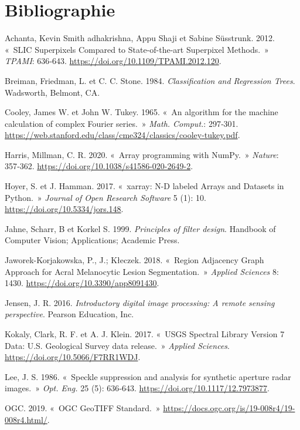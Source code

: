 \documentclass[
  french,
  11pt,
  letterpaper,
  open=any,
  twoside=false,
  french]{scrbook}
\newlength{\cslhangindent}
\newenvironment{CSLReferences}[2] %
 {\begin{list}{}{%
  \setlength{\itemindent}{0pt}
  \setlength{\leftmargin}{0pt}
  \setlength{\parsep}{0pt}
  \ifodd #1
   \setlength{\leftmargin}{\cslhangindent}
   \setlength{\itemindent}{-1\cslhangindent}
  \fi
  \setlength{\itemsep}{#2\baselineskip}}}
 {\end{list}}
\begin{document}

\chapter*{Bibliographie}\label{bibliographie}


\protect{}\label{refs}
\begin{CSLReferences}{1}{0}
Achanta, Kevin Smith adhakrishna, Appu Shaji et Sabine Süsstrunk. 2012.
{«~SLIC Superpixels Compared to State-of-the-art Superpixel Methods.~»}
\emph{{TPAMI}}: 636‑643. \url{https://doi.org/10.1109/TPAMI.2012.120}.

Breiman, Friedman, L. et C. C. Stone. 1984. \emph{Classification and
Regression Trees}. {Wadsworth, Belmont, CA}.

Cooley, James W. et John W. Tukey. 1965. {«~An algorithm for the machine
calculation of complex Fourier series.~»} \emph{{Math. Comput.}}:
297‑301.
\url{https://web.stanford.edu/class/cme324/classics/cooley-tukey.pdf}.

Harris, Millman, C. R. 2020. {«~Array programming with NumPy.~»}
\emph{{Nature}}: 357‑362.
\url{https://doi.org/10.1038/s41586-020-2649-2}.

Hoyer, S. et J. Hamman. 2017. {«~xarray: N-D labeled Arrays and Datasets
in Python.~»} \emph{{Journal of Open Research Software}} 5 (1): 10.
\url{https://doi.org/10.5334/jors.148}.

Jahne, Scharr, B et Korkel S. 1999. \emph{Principles of filter design}.
Handbook of Computer Vision; Applications; Academic Press.

Jaworek-Korjakowska, P., J.; Kłeczek. 2018. {«~Region Adjacency Graph
Approach for Acral Melanocytic Lesion Segmentation.~»} \emph{{Applied
Sciences}} 8: 1430. \url{https://doi.org/10.3390/app8091430}.

Jensen, J. R. 2016. \emph{Introductory digital image processing: A
remote sensing perspective}. {Pearson Education, Inc.}

Kokaly, Clark, R. F. et A. J. Klein. 2017. {«~USGS Spectral Library
Version 7 Data: U.S. Geological Survey data release.~»} \emph{{Applied
Sciences}}. \url{https://doi.org/10.5066/F7RR1WDJ}.

Lee, J. S. 1986. {«~Speckle suppression and analysis for synthetic
aperture radar images.~»} \emph{{Opt. Eng.}} 25 (5): 636‑643.
\url{https://doi.org/10.1117/12.7973877}.

OGC. 2019. {«~{OGC GeoTIFF Standard}.~»}
\url{https://docs.ogc.org/is/19-008r4/19-008r4.html/}.

\end{CSLReferences}


\backmatter
\end{document}
